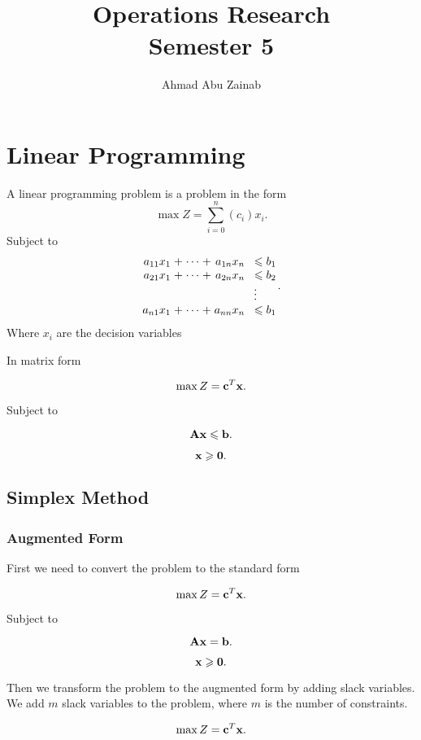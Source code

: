 \documentclass{report}
\title{\Huge{Operations Research}\\Semester 5}
\author{Ahmad Abu Zainab}
\date{}
\begin{document}
\maketitle
\newpage%
\tableofcontents
\pagebreak

\chapter{Linear Programming}

A linear programming problem is a problem in the form
\[
	\max Z = \sum_{i=0 }^{n } (c_i)x_i
	.\]
Subject to
\[
	\arraycolsep=1.4pt
	\begin{array}{rrrrrrr}
		a_{11}x_1 & + & \cdots & + & a_{1n}x_n & \leq               & b_1 \\
		a_{21}x_1 & + & \cdots & + & a_{2n}x_n & \leq               & b_2 \\
		          &   &        &   &           & \vdotswithin{\leq} &     \\
		a_{n1}x_1 & + & \cdots & + & a_{nn}x_n & \leq               & b_1
	\end{array}
	.\]
Where $x_i$ are the decision variables

In matrix form

\[
	\max Z = \vb{c}^T \vb{x}
	.\]

Subject to

\[
	\vb{A}\vb{x} \leqslant \vb{b}
	.\]

\[
	\vb{x} \geqslant \vb{0}
	.\]
\section{Simplex Method}

\subsection{Augmented Form}
First we need to convert the problem to the standard form

\[
	\max Z = \vb{c}^T \vb{x}
	.\]

Subject to

\[
	\vb{A}\vb{x} = \vb{b}
	.\]

\[
	\vb{x} \geqslant \vb{0}
	.\]

Then we transform the problem to the augmented form by adding slack variables. We add $m$ slack variables to the problem, where $m$ is the number of constraints.

\[
	\max Z = \vb{c}^T \vb{x}
	.\]
\end{document}
